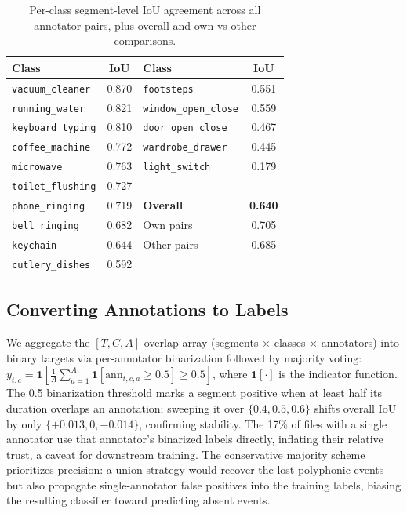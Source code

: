 \documentclass{article}
\begin{document}
\begin{table}[t]
  \centering
  \caption{Per-class segment-level IoU agreement across all annotator pairs, plus overall and own-vs-other comparisons.}
  \label{tab:agreement}
  \begin{tabular}{lclc}
    \toprule
    Class & IoU & Class & IoU \\
    \midrule
    \texttt{vacuum\_cleaner} & 0.870 & \texttt{footsteps} & 0.551 \\
    \texttt{running\_water} & 0.821 & \texttt{window\_open\_close} & 0.559 \\
    \texttt{keyboard\_typing} & 0.810 & \texttt{door\_open\_close} & 0.467 \\
    \texttt{coffee\_machine} & 0.772 & \texttt{wardrobe\_drawer} & 0.445 \\
    \texttt{microwave} & 0.763 & \texttt{light\_switch} & 0.179 \\
    \texttt{toilet\_flushing} & 0.727 & & \\
    \texttt{phone\_ringing} & 0.719 & \textbf{Overall} & \textbf{0.640} \\
    \texttt{bell\_ringing} & 0.682 & Own pairs & 0.705 \\
    \texttt{keychain} & 0.644 & Other pairs & 0.685 \\
    \texttt{cutlery\_dishes} & 0.592 & & \\
    \bottomrule
  \end{tabular}
\end{table}

\subsection{Converting Annotations to Labels}

We aggregate the $[T, C, A]$ overlap array (segments $\times$ classes $\times$ annotators) into binary targets via per-annotator binarization followed by majority voting: $y_{t,c} = \mathbf{1}\!\left[\frac{1}{A}\sum_{a=1}^{A}\mathbf{1}[\text{ann}_{t,c,a}\!\geq\!0.5]\geq 0.5\right]$, where $\mathbf{1}[\cdot]$ is the indicator function. The 0.5 binarization threshold marks a segment positive when at least half its duration overlaps an annotation; sweeping it over $\{0.4, 0.5, 0.6\}$ shifts overall IoU by only $\{+0.013, 0, -0.014\}$, confirming stability. The 17\% of files with a single annotator use that annotator's binarized labels directly, inflating their relative trust, a caveat for downstream training. The conservative majority scheme prioritizes precision: a union strategy would recover the lost polyphonic events but also propagate single-annotator false positives into the training labels, biasing the resulting classifier toward predicting absent events.
\end{document}
